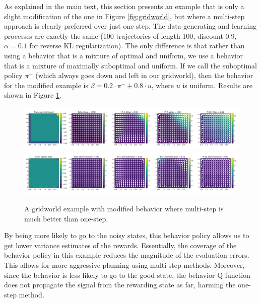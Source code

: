 \clearpage
\begin{subappendices}
\label{sec:app_grid}

As explained in the main text, this section presents an example that is only a slight modification of the one in Figure \ref{fig:gridworld}, but where a multi-step approach is clearly preferred over just one step. The data-generating and learning processes are exactly the same (100 trajectories of length 100, discount 0.9, $ \alpha = 0.1$ for reverse KL regularization). The only difference is that rather than using a behavior that is a mixture of optimal and uniform, we use a behavior that is a mixture of maximally suboptimal and uniform. If we call the suboptimal policy $ \pi^-$ (which always goes down and left in our gridworld), then the behavior for the modified example is $ \beta = 0.2 \cdot \pi^- + 0.8 \cdot u$, where $ u $ is uniform. Results are shown in Figure \ref{fig:multi_gridworld}.

\begin{figure}[h]
    \centering
    \includegraphics[width=\textwidth]{figures/offline-rl/gridworld/multi_gridworld_flat.png}
    \includegraphics[width=\textwidth]{figures/offline-rl/gridworld/multi_gridworld_error.png}
    \caption{A gridworld example with modified behavior where multi-step is much better than one-step.}
    \label{fig:multi_gridworld}
\end{figure}

By being more likely to go to the noisy states, this behavior policy allows us to get lower variance estimates of the rewards. Essentially, the coverage of the behavior policy in this example reduces the magnitude of the evaluation errors. This allows for more aggressive planning using multi-step methods. Moreover, since the behavior is less likely to go to the good state, the behavior Q function does not propagate the signal from the rewarding state as far, harming the one-step method.


\end{subappendices}
